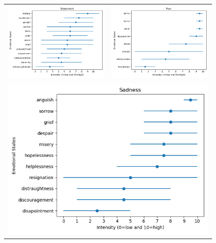 \begin{figure}[ht]
\begin{tabular}{cc}
        \includegraphics[scale=0.5]{Images/AtlasEmotionalStatesGraphics/Figure_Enjoyment.png} & \includegraphics[scale=0.5]{Images/AtlasEmotionalStatesGraphics/Figure_Fear.png} \\
        \multicolumn{2}{c}{\includegraphics[scale=0.5]{Images/AtlasEmotionalStatesGraphics/Figure_Sadness.png}}
    \end{tabular}
    

\end{figure}
